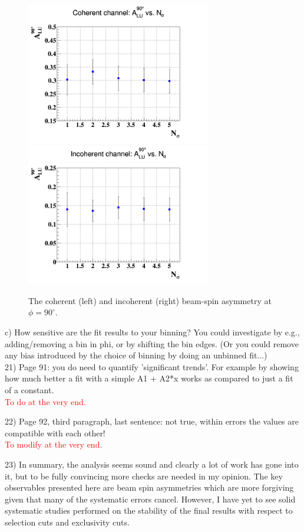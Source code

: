 \begin{figure}[h!]
   \includegraphics[height=6.2cm]{fig/coh_Alu_Nsig.png}
   \includegraphics[height=6.2cm]{fig/incoh_Alu_Nsig.png}
   \caption{The coherent (left) and incoherent (right) beam-spin asymmetry at 
$\phi = 90 ^{\circ}$. }
\label{fig:sys_fit_Alu}
\end{figure}




  
  c) How sensitive are the fit results to your binning? You could investigate 
by e.g., adding/removing a bin in phi, or  by shifting the bin edges. (Or you 
could remove any bias introduced by the choice of binning by doing an unbinned 
fit...)\\

21) Page 91: you do need to quantify 'significant trends'. For example by 
showing how much better a fit with a simple A1 + A2*x works as compared to just 
a fit of a constant.\\
\textcolor{red}{To do at the very end.}

22) Page 92, third paragraph, last sentence: not true, within errors the values 
are compatible with each other!\\
\textcolor{red}{To modify at the very end.}

23) In summary, the analysis seems sound and clearly a lot of work has gone 
into it, but to be fully convincing more checks are needed in my opinion.  The 
key observables presented here are beam spin asymmetries which are more 
forgiving given that many of the systematic errors cancel.  However, I have yet 
to see solid systematic studies performed on the stability of the final results 
with respect to selection cuts and exclusivity cuts. 
 
